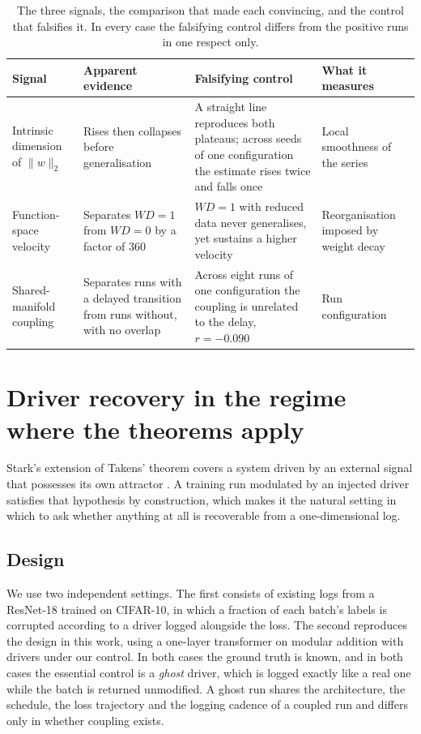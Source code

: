 \documentclass{article}
\begin{document}
\begin{table}[H]
\centering
\caption{The three signals, the comparison that made each convincing, and the control that
falsifies it. In every case the falsifying control differs from the positive runs in one
respect only.}
\label{tab:failures}
\small
\begin{tabular}{@{}p{}p{}p{}p{}@{}}
\toprule
\textbf{Signal} & \textbf{Apparent evidence} & \textbf{Falsifying control} & \textbf{What it measures} \\
\midrule
Intrinsic dimension of $\lVert w \rVert_2$
& Rises then collapses before generalisation
& A straight line reproduces both plateaus; across seeds of one configuration the estimate rises twice and falls once
& Local smoothness of the series \\
\addlinespace
Function-space velocity
& Separates $WD=1$ from $WD=0$ by a factor of $360$
& $WD=1$ with reduced data never generalises, yet sustains a higher velocity
& Reorganisation imposed by weight decay \\
\addlinespace
Shared-manifold coupling
& Separates runs with a delayed transition from runs without, with no overlap
& Across eight runs of one configuration the coupling is unrelated to the delay, $r = -0.090$
& Run configuration \\
\bottomrule
\end{tabular}
\end{table}

\section{Driver recovery in the regime where the theorems apply}\label{sec:ccm}

Stark's extension of Takens' theorem covers a system driven by an external signal that
possesses its own attractor \citep{stark1999delay, stark2003delay}. A training run
modulated by an injected driver satisfies that hypothesis by construction, which makes it
the natural setting in which to ask whether anything at all is recoverable from a
one-dimensional log.

\subsection{Design}

We use two independent settings. The first consists of existing logs from a ResNet-18
trained on CIFAR-10, in which a fraction of each batch's labels is corrupted according to
a driver logged alongside the loss. The second reproduces the design in this work, using a
one-layer transformer on modular addition with drivers under our control. In both cases
the ground truth is known, and in both cases the essential control is a \emph{ghost}
driver, which is logged exactly like a real one while the batch is returned unmodified.
A ghost run shares the architecture, the schedule, the loss trajectory and the logging
cadence of a coupled run and differs only in whether coupling exists.
\end{document}
